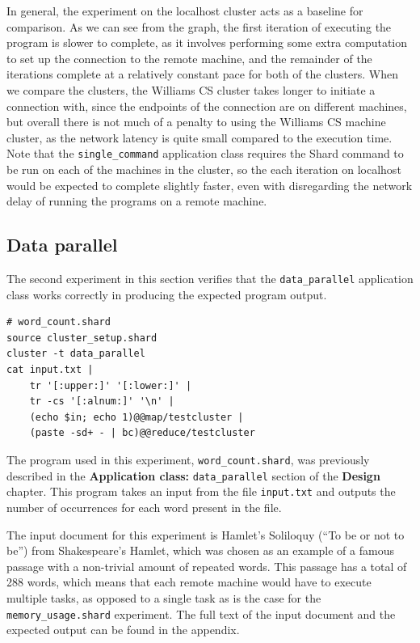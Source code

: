 \documentclass[oneside]{report}
\begin{document}
In general, the experiment on the localhost cluster acts as a baseline for comparison.
As we can see from the graph, the first iteration of executing the program is slower to complete, as it involves performing some extra computation to set up the connection to the remote machine, and the remainder of the iterations complete at a relatively constant pace for both of the clusters.
When we compare the clusters, the Williams CS cluster takes longer to initiate a connection with, since the endpoints of the connection are on different machines, but overall there is not much of a penalty to using the Williams CS machine cluster, as the network latency is quite small compared to the execution time.
Note that the \texttt{single\_command} application class requires the Shard command to be run on each of the machines in the cluster, so the each iteration on localhost would be expected to complete slightly faster, even with disregarding the network delay of running the programs on a remote machine.


\subsection{Data parallel}
The second experiment in this section verifies that the \texttt{data\_parallel} application class works correctly in producing the expected program output.

\begin{minipage}[c]{\textwidth-15pt}
  \begin{lstlisting}[language=Shard]
# word_count.shard
source cluster_setup.shard
cluster -t data_parallel
cat input.txt |
    tr '[:upper:]' '[:lower:]' |
    tr -cs '[:alnum:]' '\n' |
    (echo $in; echo 1)@@map/testcluster |
    (paste -sd+ - | bc)@@reduce/testcluster
\end{lstlisting}
  \smallskip
\end{minipage}

The program used in this experiment, \texttt{word\_count.shard}, was previously described in the \textbf{Application class: }\texttt{data\_parallel} section of the \textbf{Design} chapter.
This program takes an input from the file \texttt{input.txt} and outputs the number of occurrences for each word present in the file.

The input document for this experiment is Hamlet's Soliloquy (``To be or not to be'') from Shakespeare's Hamlet, which was chosen as an example of a famous passage with a non-trivial amount of repeated words.
This passage has a total of 288 words, which means that each remote machine would have to execute multiple tasks, as opposed to a single task as is the case for the \texttt{memory\_usage.shard} experiment.
The full text of the input document and the expected output can be found in the appendix.
\end{document}
